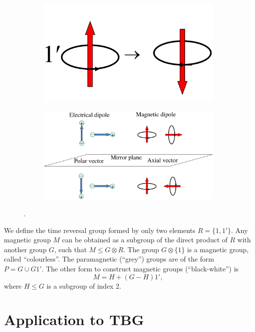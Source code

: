 \begin{figure}[H]
\centering
\begin{subfigure}{.4\textwidth}
  \centering
  \includegraphics[height=0.4\linewidth]{fig/timerev.png}
  \caption{}
  \label{fig:timerev}
\end{subfigure}%
\begin{subfigure}{.6\textwidth}
  \centering
  \includegraphics[width=\linewidth]{fig/axialvec.png}
  \caption{}
  \label{fig:axialvec}
\end{subfigure}
\caption{.}
\label{fig:geometry}
\end{figure}

We define the time reversal group formed by only two elements $R = \{1, 1'\}$. Any magnetic group $M$ can be obtained as a subgroup of the direct product of $R$ with another group $G$, such that $M \leq G \otimes R$. The group $G \otimes \{1\}$ is a magnetic group, called ``colourless''. The paramagnetic (``grey'') groups are of the form $P = G \cup G1'$. The other form to construct magnetic groups (``black-white'') is
$$
M = H + (G - H) 1',
$$
where $H \leq G$ is a subgroup of index 2.


\section{Application to TBG}

